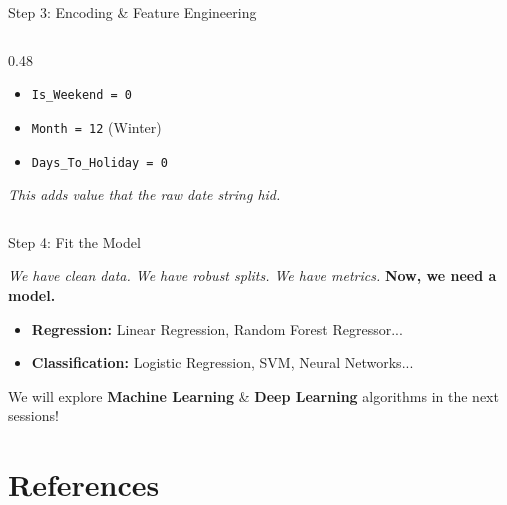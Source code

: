 \begin{frame}{Step 3: Encoding \& Feature Engineering}
\begin{columns}[T]
\begin{column}{0.48\textwidth}
\begin{tcolorbox}[colback=green!5, boxrule=0pt]
                \begin{itemize}
                    \item \texttt{Is\_Weekend = 0}
                    \item \texttt{Month = 12} (Winter)
                    \item \texttt{Days\_To\_Holiday = 0}
                \end{itemize}
            \end{tcolorbox}
            \small \textit{This adds value that the raw date string hid.}
        \end{column}
    \end{columns}
\end{frame}


\begin{frame}{Step 4: Fit the Model}

    \centering
    \large
    \textit{We have clean data. We have robust splits. We have metrics.}
    \vspace{0.3em} %
    \textbf{Now, we need a model.}
    
    \vspace{0.8em} %

    \begin{tcolorbox}[colback=blue!5, colframe=blue!50, title=The Options, width=\textwidth]
        \begin{itemize}
            \item \textbf{Regression:} Linear Regression, Random Forest Regressor...
            \item \textbf{Classification:} Logistic Regression, SVM, Neural Networks...
        \end{itemize}
    \end{tcolorbox}

    \centering
    \begin{block}{}
        \centering
        We will explore \textbf{Machine Learning} \& \textbf{Deep Learning} algorithms in the next sessions!
    \end{block}

\end{frame}

\section{References}
